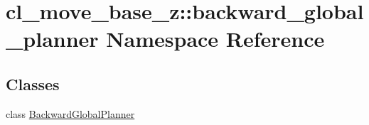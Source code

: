 \hypertarget{namespacecl__move__base__z_1_1backward__global__planner}{}\section{cl\+\_\+move\+\_\+base\+\_\+z\+:\+:backward\+\_\+global\+\_\+planner Namespace Reference}
\label{namespacecl__move__base__z_1_1backward__global__planner}
\subsection*{Classes}
\begin{DoxyCompactItemize}
\item 
class \hyperlink{classcl__move__base__z_1_1backward__global__planner_1_1BackwardGlobalPlanner}{Backward\+Global\+Planner}
\end{DoxyCompactItemize}
